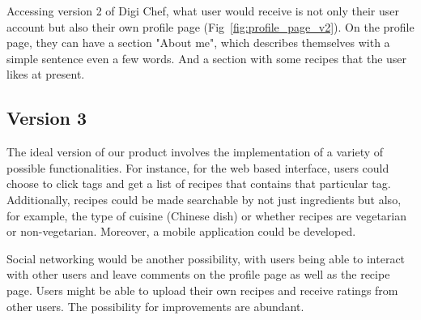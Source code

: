 Accessing version 2 of Digi Chef, what user would receive is not only their user account but also their own profile page (Fig~\ref{fig:profile_page_v2}). On the profile page, they can have a section "About me", which describes themselves with a simple sentence even a few words. And a section with some recipes that the user likes at present.

\subsection{Version 3}
The ideal version of our product involves the implementation of a variety of possible functionalities. For instance, for the web based interface, users could choose to click tags and get a list of recipes that contains that particular tag. Additionally, recipes could be made searchable by not just ingredients but also, for example, the type of cuisine (Chinese dish) or whether recipes are vegetarian or non-vegetarian. Moreover, a mobile application could be developed. 

Social networking would be another possibility, with users being able to interact with other users and leave comments on the profile page as well as the recipe page. Users might be able to upload their own recipes and receive ratings from other users. The possibility for improvements are abundant.
